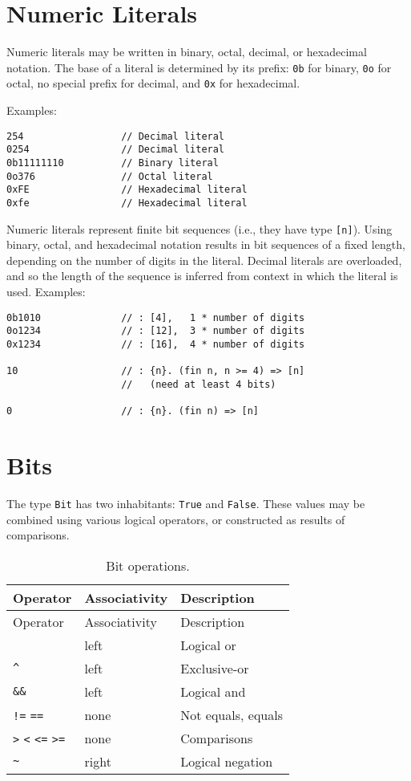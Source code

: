 \section{Numeric Literals}\label{numeric-literals}

Numeric literals may be written in binary, octal, decimal, or
hexadecimal notation. The base of a literal is determined by its prefix:
\texttt{0b} for binary, \texttt{0o} for octal, no special prefix for
decimal, and \texttt{0x} for hexadecimal.

Examples:

\begin{verbatim}
254                 // Decimal literal
0254                // Decimal literal
0b11111110          // Binary literal
0o376               // Octal literal
0xFE                // Hexadecimal literal
0xfe                // Hexadecimal literal
\end{verbatim}

Numeric literals represent finite bit sequences (i.e., they have type
\texttt{{[}n{]}}). Using binary, octal, and hexadecimal notation results
in bit sequences of a fixed length, depending on the number of digits in
the literal. Decimal literals are overloaded, and so the length of the
sequence is inferred from context in which the literal is used.
Examples:

\begin{verbatim}
0b1010              // : [4],   1 * number of digits
0o1234              // : [12],  3 * number of digits
0x1234              // : [16],  4 * number of digits

10                  // : {n}. (fin n, n >= 4) => [n]
                    //   (need at least 4 bits)

0                   // : {n}. (fin n) => [n]
\end{verbatim}

\section{Bits}\label{bits}

The type \texttt{Bit} has two inhabitants: \texttt{True} and
\texttt{False}. These values may be combined using various logical
operators, or constructed as results of comparisons.

\begin{longtable}[c]{@{}lll@{}}
\caption{Bit operations.}\tabularnewline
\toprule
Operator & Associativity & Description\tabularnewline
\midrule
\endfirsthead
\toprule
Operator & Associativity & Description\tabularnewline
\midrule
\endhead
\texttt{\textbar{}\textbar{}} & left & Logical or\tabularnewline
\texttt{\^{}} & left & Exclusive-or\tabularnewline
\texttt{\&\&} & left & Logical and\tabularnewline
\texttt{!=} \texttt{==} & none & Not equals, equals\tabularnewline
\texttt{\textgreater{}} \texttt{\textless{}} \texttt{\textless{}=}
\texttt{\textgreater{}=} & none & Comparisons\tabularnewline
\texttt{\textasciitilde{}} & right & Logical negation\tabularnewline
\bottomrule
\end{longtable}

